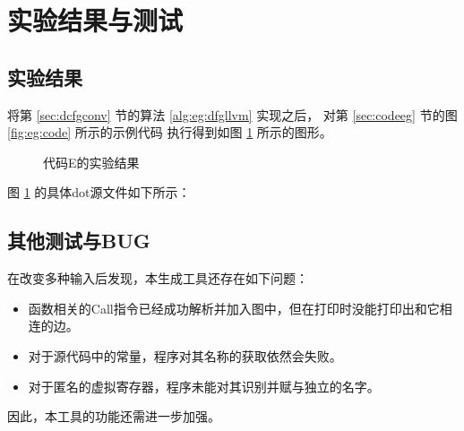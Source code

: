 
\section{实验结果与测试}

\subsection{实验结果} \label{sec:r:result}

将第 \ref{sec:dcfgconv} 节的算法 \ref{alg:eg:dfgllvm} 实现之后，
对第 \ref{sec:codeeg} 节的图 \ref{fig:eg:code} 所示的示例代码
执行得到如图 \ref{fig:eg:result} 所示的图形。

\newsavebox{\egresult}
\begin{figure}[!hbt]
\centering
\usebox{\egresult}
\caption{代码E的实验结果} \label{fig:eg:result}
\end{figure}

图 \ref{fig:eg:result} 的具体dot源文件如下所示：

{
    
}

\subsection{其他测试与BUG}

在改变多种输入后发现，本生成工具还存在如下问题：

{
\begin{itemize}
    \addtolength{\itemindent}{2.5em}
    \item 函数相关的Call指令已经成功解析并加入图中，但在打印时没能打印出和它相连的边。
    \item 对于源代码中的常量，程序对其名称的获取依然会失败。
    \item 对于匿名的虚拟寄存器，程序未能对其识别并赋与独立的名字。
\end{itemize}
}

因此，本工具的功能还需进一步加强。